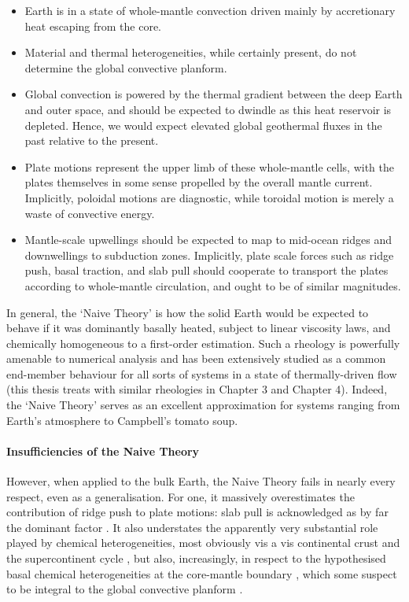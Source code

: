 \documentclass[a4paper,11pt,oneside]{book}
\begin{document}
\begin{itemize}
\item Earth is in a state of whole-mantle convection driven mainly by accretionary heat escaping from the core.


\item Material and thermal heterogeneities, while certainly present, do not determine the global convective planform.


\item Global convection is powered by the thermal gradient between the deep Earth and outer space, and should be expected to dwindle as this heat reservoir is depleted. Hence, we would expect elevated global geothermal fluxes in the past relative to the present.


\item Plate motions represent the upper limb of these whole-mantle cells, with the plates themselves in some sense propelled by the overall mantle current. Implicitly, poloidal motions are diagnostic, while toroidal motion is merely a waste of convective energy.


\item Mantle-scale upwellings should be expected to map to mid-ocean ridges and downwellings to subduction zones. Implicitly, plate scale forces such as ridge push, basal traction, and slab pull should cooperate to transport the plates according to whole-mantle circulation, and ought to be of similar magnitudes.
\end{itemize}

In general, the `Naive Theory' is how the solid Earth would be expected to behave if it was dominantly basally heated, subject to linear viscosity laws, and chemically homogeneous to a first-order estimation. Such a rheology is powerfully amenable to numerical analysis and has been extensively studied as a common end-member behaviour for all sorts of systems in a state of thermally-driven flow (this thesis treats with similar rheologies in Chapter 3 and Chapter 4). Indeed, the `Naive Theory' serves as an excellent approximation for systems ranging from Earth's atmosphere to Campbell's tomato soup.

\paragraph{Insufficiencies of the Naive Theory}

However, when applied to the bulk Earth, the Naive Theory fails in nearly every respect, even as a generalisation. For one, it massively overestimates the contribution of ridge push to plate motions: slab pull is acknowledged as by far the dominant factor \cite{Forsyth1975-jh}. It also understates the apparently very substantial role played by chemical heterogeneities, most obviously vis a vis continental crust and the supercontinent cycle \citet{ONeill2009-ft, Zhong2007-wu}, but also, increasingly, in respect to the hypothesised basal chemical heterogeneities at the core-mantle boundary \citet{Zhong2016-bm, Torsvik2006-mg}, which some suspect to be integral to the global convective planform \citet{Conrad2013-ev, Arnould2018-ci}.
\end{document}
